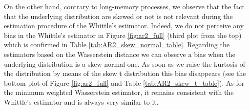 \documentclass[
  11pt,
]{article}
\begin{document}
On the other hand, contrary to long-memory processes, we observe that
the fact that the underlying distribution are skewed or not is not
relevant during the estimation procedure of the Whittle's estimator.
Indeed, we do not perceive any bias in the Whittle's estimator in Figure
\ref{fig:ar2_full} (third plot from the top) which is confirmed in Table
\ref{tab:AR2_skew_normal_table}. Regarding the estimators based on the
Wasserstein distance we can observe a bias when the underlying
distribution is a skew normal one. As soon as we raise the kurtosis of
the distribution by means of the skew t distribution this bias
disappears (see the bottom plot of Figure \ref{fig:ar2_full} and Table
\ref{tab:AR2_skew_t_table}). As for the minimum weighted Wasserstein
estimator, it remains consistent with the Whittle's estimator and is
always very similar to it.
\end{document}
